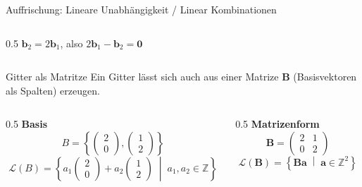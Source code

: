 \begin{frame}{Auffrischung: Lineare Unabhängigkeit / Linear Kombinationen}
\begin{columns}[T]
\begin{column}{0.5\textwidth}
            \vspace{0.3em}
            {\small $\mathbf{b}_2 = 2\mathbf{b}_1$, also $2\mathbf{b}_1 - \mathbf{b}_2 = \mathbf{0}$}
        \end{column}
    \end{columns}
\end{frame}

\begin{frame}{Gitter als Matritze}
    Ein Gitter lässt sich auch aus einer Matrize $\mathbf{B}$ (Basisvektoren als Spalten) erzeugen.

    \vspace{1em}
    \begin{columns}[T]
        \begin{column}{0.5\textwidth}
            \centering
            \textbf{Basis}
            \[
                B = \left\{ \begin{pmatrix} 2 \\ 0 \end{pmatrix}, \begin{pmatrix} 1 \\ 2 \end{pmatrix} \right\}
            \]
            \[
                \mathcal{L}(B) = \left\{ a_1 \begin{pmatrix} 2 \\ 0 \end{pmatrix} + a_2 \begin{pmatrix} 1 \\ 2 \end{pmatrix} \;\middle|\; a_1, a_2 \in \mathbb{Z} \right\}
            \]
        \end{column}
        \begin{column}{0.5\textwidth}
            \centering
            \textbf{Matrizenform}
            \[
                \mathbf{B} = \begin{pmatrix} 2 & 1 \\ 0 & 2 \end{pmatrix}
            \]
            \[
                \mathcal{L}(\mathbf{B}) = \left\{ \mathbf{B}\mathbf{a} \;\middle|\; \mathbf{a} \in \mathbb{Z}^2 \right\}
            \]
        \end{column}
    \end{columns}
\end{frame}

